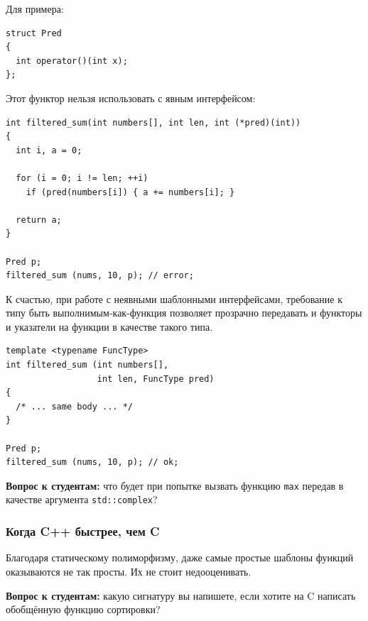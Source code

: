 \documentclass[a4paper,12pt,oneside]{article}
\newif\ifanswers
\begin{document}
Для примера:

\begin{lstlisting}
struct Pred 
{
  int operator()(int x);
};
\end{lstlisting}

Этот функтор нельзя использовать с явным интерфейсом:

\begin{lstlisting}
int filtered_sum(int numbers[], int len, int (*pred)(int))
{
  int i, a = 0;

  for (i = 0; i != len; ++i)
    if (pred(numbers[i]) { a += numbers[i]; }

  return a;
}

Pred p;
filtered_sum (nums, 10, p); // error;
\end{lstlisting}

К счастью, при работе с неявными шаблонными интерфейсами, требование к типу быть выполнимым-как-функция позволяет прозрачно передавать и функторы и указатели на функции в качестве такого типа.
 
\begin{lstlisting}
template <typename FuncType>
int filtered_sum (int numbers[], 
                  int len, FuncType pred) 
{ 
  /* ... same body ... */ 
}

Pred p;
filtered_sum (nums, 10, p); // ok;
\end{lstlisting}

\textbf{Вопрос к студентам:} что будет при попытке вызвать функцию \lstinline!max! передав в качестве аргумента \lstinline!std::complex!?

\ifanswers
Правильный ответ: увы, на комплексных числах нельзя ввести ни порядка ни даже частичного порядка. Будет ошибка компиляции.
\fi

\subsubsection{Когда C++ быстрее, чем C}\label{CppBetterC}

Благодаря статическому полиморфизму, даже самые простые шаблоны функций оказываются не так просты. Их не стоит недооценивать. 

\textbf{Вопрос к студентам:} какую сигнатуру вы напишете, если хотите на C написать обобщённую функцию сортировки? 

\ifanswers
Ответ: стандарт языка C99 регламентирует (пункт 7.20.5.2) следующую сигнатуру:

\begin{lstlisting}
void qsort (void *base, size_t nmemb, size_t size, 
            int (*compar)(const void *, const void *));
\end{lstlisting}
\fi
\end{document}
